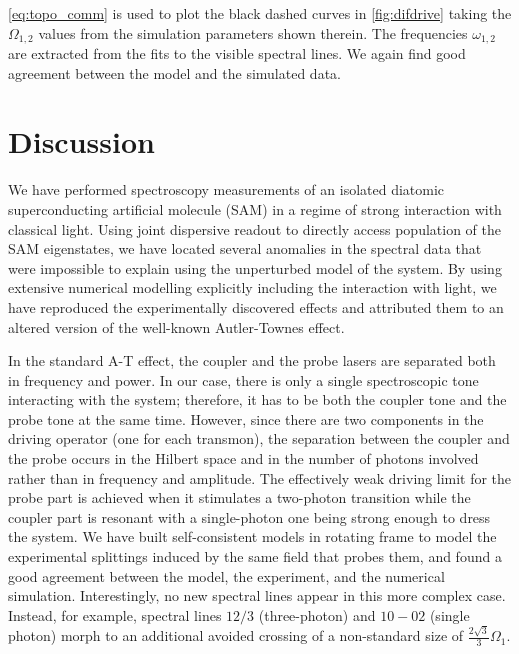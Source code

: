 \documentclass[%
 pra,
 amsmath,amssymb,
 reprint,%
]{revtex4-1}
\begin{document}
\autoref{eq:topo_comm} is used to plot the black 
dashed curves in \autoref{fig:difdrive} taking 
the $\Omega_{1,2}$ values from the simulation 
parameters shown therein. The frequencies 
$\omega_{1,2}$ are extracted from the fits to the 
visible spectral lines. We again find good agreement 
between the model and the simulated data.


\section{Discussion}

We have performed spectroscopy measurements of an 
isolated diatomic superconducting artificial 
molecule (SAM) in a regime of strong interaction 
with classical light. Using joint dispersive 
readout to directly access population of the SAM 
eigenstates, we have located several anomalies in 
the spectral data that were impossible to explain 
using the unperturbed model of the system. By 
using extensive numerical modelling explicitly 
including the interaction with light, we have 
reproduced the experimentally discovered effects 
and attributed them to an altered version of the 
well-known Autler-Townes effect.

In the standard A-T effect, the coupler and the 
probe lasers are separated both in frequency and power. 
In our case, there is only a single spectroscopic 
tone interacting with the system; therefore, 
it has to be both the coupler tone and the probe 
tone at the same time. However, since there are 
two components in the driving operator (one for 
each transmon), the separation between the 
coupler and the probe occurs in the Hilbert space and in the number of photons involved 
rather than in frequency and amplitude. The 
effectively weak driving limit for the probe part is 
achieved when it stimulates a two-photon 
transition while the coupler part is resonant 
with a single-photon one being strong enough to dress the 
system. We have built self-consistent models in 
rotating frame to 
model the experimental splittings induced by the 
same field that probes them, and found a good 
agreement between the model, the experiment, and 
the numerical simulation. Interestingly, no new spectral lines appear in this 
more complex case. Instead, for example, spectral 
lines $12/3$ (three-photon) and $10-02$ (single 
photon) morph to an additional avoided crossing of a 
non-standard size of $\frac{2\sqrt{3}}{3} 
\Omega_1$.
\end{document}

